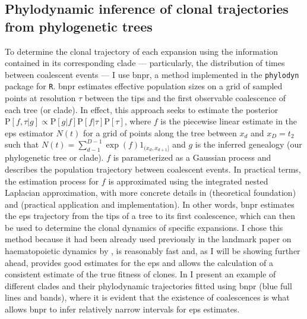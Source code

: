 \subsection{Phylodynamic inference of clonal trajectories from phylogenetic trees}

To determine the clonal trajectory of each expansion using the information contained in its corresponding clade --- particularly, the distribution of times between coalescent events --- I use \ac{bnpr}, a method implemented in the \texttt{phylodyn} \cite{Lan2015-sw,Karcher2017-kt} package for \texttt{R}. \ac{bnpr} estimates effective population sizes on a grid of sampled points at resolution $\tau$ between the tips and the first observable coalescence of each tree (or clade). In effect, this approach seeks to estimate the posterior $\mathrm{P}[f,\tau|g] \propto \mathrm{P}[g|f]\mathrm{P}[f|\tau]\mathrm{P}[\tau]$, where $f$ is the piecewise linear estimate in the \ac{eps} estimator $N(t)$ for a grid of points along the tree between $x_d$ and $x_D=t_2$ such that $N(t) = \sum^{D-1}_{d-1}\exp(f)1_{(x_d,x_{d+1}]}$ and $g$ is the inferred genealogy (our phylogenetic tree or clade). $f$ is parameterized as a Gaussian process and describes the population trajectory between coalescent events. In practical terms, the estimation process for $f$ is approximated using the integrated nested Laplacian approximation, with more concrete details in \cite{Lan2015-sw} (theoretical foundation) and \cite{Karcher2017-kt} (practical application and implementation). In other words, \ac{bnpr} estimates the \ac{eps} trajectory from the tips of a tree to its first coalescence, which can then be used to determine the clonal dynamics of specific expansions. I chose this method because it had been already used previously in the landmark paper on haematopoietic dynamics by , is reasonably fast and, as I will be showing further ahead, provides good estimates for the \ac{eps} and allows the calculation of a consistent estimate of the true fitness of clones. In  I present an example of different clades and their phylodynamic trajectories fitted using \ac{bnpr} (blue full lines and bands), where it is evident that the existence of coalescences is what allows \ac{bnpr} to infer relatively narrow intervals for \ac{eps} estimates.

\begin{figure}[!ht]
	\label{fig:models-bnpr-example}
\end{figure}

